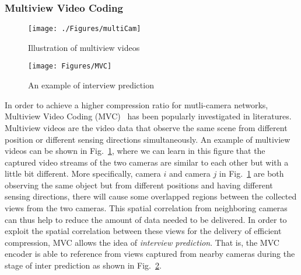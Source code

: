 \subsubsection{Multiview Video Coding}
\label{sec::MultiviewIntro}
%
\begin{figure}
\begin{center}
\texttt{[image: ./Figures/multiCam]}
\caption{\label{fig::multiCam}Illustration of multiview videos}
\end{center}
\end{figure}
%
\begin{figure}
\centering
\texttt{[image: Figures/MVC]}
\caption{An example of interview prediction~\cite{MVCoverview}\label{fig::MVC}}
\end{figure}
%
In order to achieve a higher compression ratio for mutli-camera networks, Multiview Video Coding (MVC)~\cite{MVCoverview} has been popularly investigated in literatures.
Multiview videos are the video data that observe the same scene from different position or different sensing directions simultaneously.
An example of multiview videos can be shown in Fig.~\ref{fig::multiCam}, where we can learn in this figure that the captured video streams of the two cameras are similar to each other but with a little bit different.
More specifically, camera $i$ and camera $j$ in Fig.~\ref{fig::multiCam} are both observing the same object but from different positions and having different sensing directions, there will cause some overlapped regions between the collected views from the two cameras.
This spatial correlation from neighboring cameras can thus help to reduce the amount of data needed to be delivered.
In order to exploit the spatial correlation between these views for the delivery of efficient compression, MVC allows the idea of \emph{interview prediction}.
That is, the MVC encoder is able to reference from views captured from nearby cameras during the stage of inter prediction as shown in Fig.~\ref{fig::MVC}.

